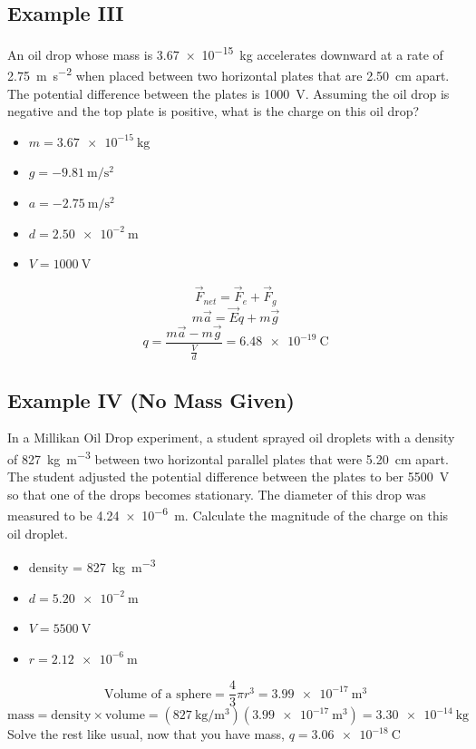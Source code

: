 \documentclass[a4paper,12pt]{article}
\begin{document}
\subsection{Example III}
An oil drop whose mass is \SI{3.67e-15}{\kg} accelerates downward at a rate of \SI{2.75}{\m\per\s\squared} when placed between two horizontal plates that are \SI{2.50}{\centi\m} apart. The potential difference between the plates is \SI{1000}{\volt}. Assuming the oil drop is negative and the top plate is positive, what is the charge on this oil drop?
\begin{itemize}
    \item{$m = \SI{3.67e-15}{\kg}$}
    \item{$g = \SI{-9.81}{\m\per\s\squared}$}
    \item{$a = \SI{-2.75}{\m\per\s\squared}$}
    \item{$d = \SI{2.50e-2}{\m}$}
    \item{$V = \SI{1000}{\volt}$}
\end{itemize}
$$\vec{F}_{net} = \vec{F}_e + \vec{F}_g$$
$$m\vec{a} = \vec{E}q + m\vec{g}$$
$$q = \frac{m\vec{a} - m\vec{g}}{\frac{V}{d}} = \SI{6.48e-19}{\coulomb}$$

\subsection{Example IV (No Mass Given)}
In a Millikan Oil Drop experiment, a student sprayed oil droplets with a density of \SI{827}{\kg\per\m\cubed} between two horizontal parallel plates that were \SI{5.20}{\centi\m} apart. The student adjusted the potential difference between the plates to ber \SI{5500}{\volt} so that one of the drops becomes stationary. The diameter of this drop was measured to be \SI{4.24e-6}{\m}. Calculate the magnitude of the charge on this oil droplet.
\begin{itemize}
    \item{density = \SI{827}{\kg\per\m\cubed}}
    \item{$d = \SI{5.20e-2}{\m}$}
    \item{$V = \SI{5500}{\volt}$}
    \item{$r = \SI{2.12e-6}{\m}$}
\end{itemize}

$$\textrm{Volume of a sphere} = \frac{4}{3}\pi r^3 = \SI{3.99e-17}{\m\cubed}$$
$$\textrm{mass} = \textrm{density} \times \textrm{volume} = (\SI{827}{\kg\per\m\cubed})(\SI{3.99e-17}{\m\cubed}) = \SI{3.30e-14}{\kg}$$
Solve the rest like usual, now that you have mass, $q = \SI{3.06e-18}{\coulomb}$
\end{document}
